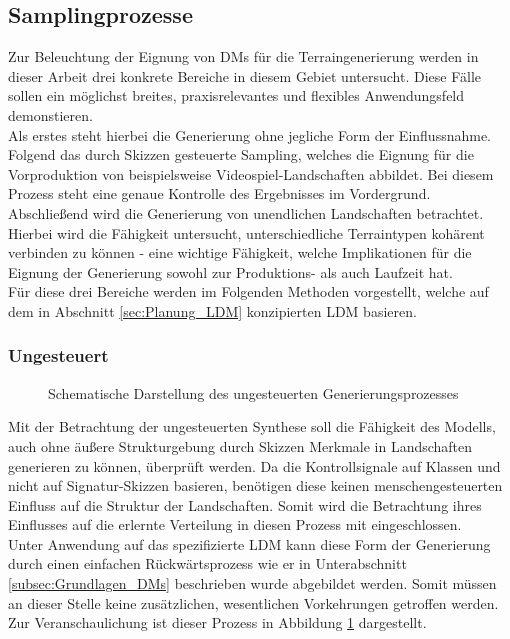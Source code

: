 \subsection {Samplingprozesse}

Zur Beleuchtung der Eignung von \ac{DM}s für die Terraingenerierung werden in dieser Arbeit drei konkrete Bereiche in diesem Gebiet untersucht. Diese Fälle sollen ein möglichst breites, praxisrelevantes und flexibles Anwendungsfeld demonstieren.\\
Als erstes steht hierbei die Generierung ohne jegliche Form der Einflussnahme. \\
Folgend das durch Skizzen gesteuerte Sampling, welches die Eignung für die Vorproduktion von beispielsweise Videospiel-Landschaften abbildet. Bei diesem Prozess steht eine genaue Kontrolle des Ergebnisses im Vordergrund. \\
Abschließend wird die Generierung von unendlichen Landschaften betrachtet. Hierbei wird die Fähigkeit untersucht, unterschiedliche Terraintypen kohärent verbinden zu können - eine wichtige Fähigkeit, welche Implikationen für die Eignung der Generierung sowohl zur Produktions- als auch Laufzeit hat. \\
Für diese drei Bereiche werden im Folgenden Methoden vorgestellt, welche auf dem in Abschnitt \ref{sec:Planung_LDM} konzipierten \ac{LDM} basieren. 


\subsubsection {Ungesteuert}

\begin{figure}[htbp]
    \centering
    \caption{Schematische Darstellung des ungesteuerten Generierungsprozesses}
    \label{fig:unguided_method}
\end{figure}
Mit der Betrachtung der ungesteuerten Synthese soll die Fähigkeit des Modells, auch ohne äußere Strukturgebung durch Skizzen Merkmale in Landschaften generieren zu können, überprüft werden. Da die Kontrollsignale auf Klassen und nicht auf Signatur-Skizzen basieren, benötigen diese keinen menschengesteuerten Einfluss auf die Struktur der Landschaften. Somit wird die Betrachtung ihres Einflusses auf die erlernte Verteilung in diesen Prozess mit eingeschlossen. \\
Unter Anwendung auf das spezifizierte \ac{LDM} kann diese Form der Generierung durch einen einfachen Rückwärtsprozess wie er in Unterabschnitt \ref{subsec:Grundlagen_DMs} beschrieben wurde abgebildet werden. Somit müssen an dieser Stelle keine zusätzlichen, wesentlichen Vorkehrungen getroffen werden. Zur Veranschaulichung ist dieser Prozess in Abbildung \ref{fig:unguided_method} dargestellt.

